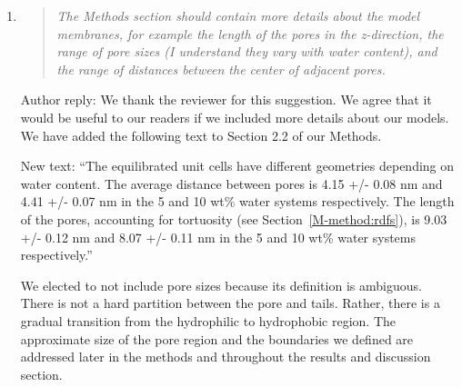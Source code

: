 \documentclass{article}
\begin{document}
\begin{enumerate}
    \item \begin{quote}
    
    \textit{The Methods section should contain more details about the model membranes, for 
    example the length of the pores in the z-direction, the range of pore sizes (I understand
    they vary with water content), and the range of distances between the center of adjacent pores.}    
    
    \end{quote}
    
    Author reply: We thank the reviewer for this suggestion. We agree that it would be useful
    to our readers if we included more details about our models. We have added the following 
    text to Section 2.2 of our Methods.
    
    New text: ``The equilibrated unit cells have different geometries depending on water content. 
    The average distance between pores is 4.15 +/- 0.08 nm and 4.41 +/- 0.07 nm
    in the 5 and 10 wt\% water systems respectively. The length of the pores, accounting
    for tortuosity (see Section~\ref{M-method:rdfs}), is 9.03 +/- 0.12 nm and 8.07 +/- 0.11
    nm in the 5 and 10 wt\% water systems respectively.''  

    We elected to not include pore sizes because its definition is ambiguous. There is not a 
    hard partition between the pore and tails. Rather, there is a gradual transition from 
    the hydrophilic to hydrophobic region. 
    The approximate size of the pore region and the 
    boundaries we defined are addressed later in the methods and throughout the results and 
    discussion section.
    

\end{enumerate}
\end{document}
